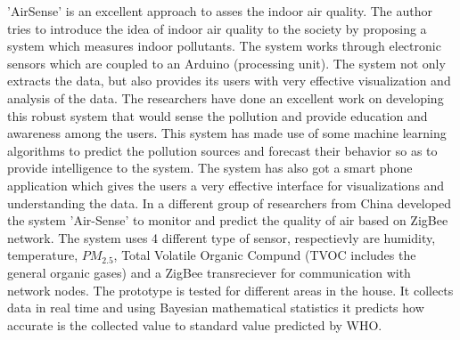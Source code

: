'AirSense'\cite{Fang2016} is an excellent approach to asses the indoor air quality. The author tries to introduce the idea of indoor air quality to the society by proposing a system which measures indoor pollutants. The system works through electronic sensors which are coupled to an Arduino (processing unit). The system not only extracts the data, but also provides its users with very effective visualization and analysis of the data. The researchers have done an excellent work on developing this robust system that would sense the pollution and provide education and awareness among the users. This system has made use of some machine learning algorithms to predict the pollution sources and forecast their behavior so as to provide intelligence to the system. 
The system has also got a smart phone application which gives the users a very effective interface for visualizations and understanding the data. In \cite{Liu2017} a different group of researchers from China developed the system 'Air-Sense' to monitor and predict the quality of air based on ZigBee network. The system uses 4 different type of sensor, respectievly are humidity, temperature, $PM_{2.5}$, Total Volatile Organic Compund (TVOC includes the general organic gases) and a ZigBee transreciever for communication with network nodes. The prototype is tested for different areas in the house. It collects data in real time and using Bayesian mathematical statistics it predicts how accurate is the collected value to standard value predicted by WHO. 
\par

